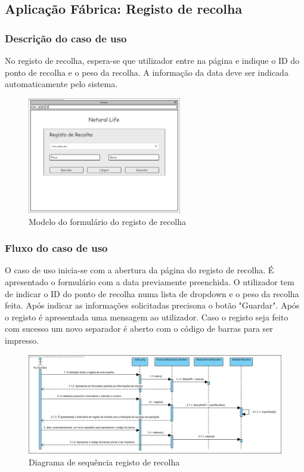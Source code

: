 \subsection{Aplicação Fábrica: Registo de recolha}
\subsubsection*{Descrição do caso de uso}
No registo de recolha, espera-se que utilizador entre na página e indique o ID do ponto de recolha e o peso da recolha. A informação da data deve ser indicada automaticamente pelo sistema. 

\begin{figure}[H] 
	\begin{center}
		\includegraphics[width=0.60\textwidth,keepaspectratio]{figuras/Diagramas_vp/DI_Fabrica_2_Registo_de_Recolha.jpg}
		\caption{Modelo do formulário do registo de recolha}
		\label{fig:di_recolha} 
	\end{center}
\end{figure}

\subsubsection*{Fluxo do caso de uso}
O caso de uso inicia-se com a abertura da página do registo de recolha. É apresentado o formulário com a data previamente preenchida. O utilizador tem de indicar o ID do ponto de recolha numa lista de dropdown e o peso da recolha feita. Após indicar as informações solicitadas precisona o botão "Guardar". Após o registo é apresentada uma mensagem ao utilizador. Caso o registo seja feito com sucesso um novo separador é aberto com o código de barras para ser impresso.


\begin{figure}[H] 
	\begin{center}
		\includegraphics[width=\textwidth,keepaspectratio]{figuras/Diagramas_vp/SD_Fabrica_2_Registo_de_Recolhas.jpg}
		\caption{Diagrama de sequência registo de recolha}
		\label{fig:sd_recolha} 
	\end{center}
\end{figure}
